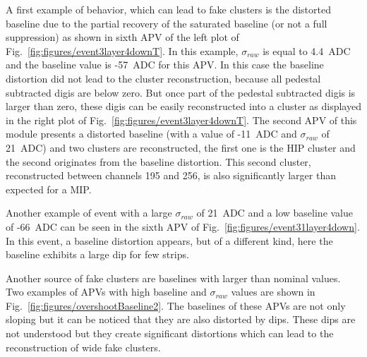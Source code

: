 A first example of behavior, which can lead to fake clusters is the distorted baseline due to the partial recovery of the saturated baseline (or not a full suppression) as shown in sixth APV of the left plot of Fig.~\ref{fig:figures/event3layer4downT}. In this example, $\sigma_{raw}$ is equal to 4.4~ADC and the baseline value is -57~ADC for this APV. In this case the baseline distortion did not lead to the cluster reconstruction, because all pedestal subtracted digis are below zero. But once part of the pedestal subtracted digis is larger than zero, these digis can be easily reconstructed into a cluster as displayed in the right plot of  Fig.~\ref{fig:figures/event3layer4downT}. The second APV of this module presents a distorted baseline (with a value of -11~ADC and $\sigma_{raw}$ of 21~ADC) and two clusters are reconstructed, the first one is the HIP cluster and the second originates from the baseline distortion. This second cluster, reconstructed between channels 195 and 256, is also significantly larger than expected for a MIP. 

Another example of event with a large $\sigma_{raw}$ of 21~ADC and a low baseline value of -66~ADC can be seen in the sixth APV of Fig.~\ref{fig:figures/event31layer4down}. In this event, a baseline distortion appears, but of a different kind, here the baseline exhibits a large dip for few strips. 

Another source of fake clusters are baselines with larger than nominal values. Two examples of APVs with high baseline and $\sigma_{raw}$ values are shown in Fig.~\ref{fig:figures/overshootBaseline2}. The baselines of these APVs are not only sloping but it can be noticed that they are also distorted by dips. These dips are not understood but they create significant distortions which can lead to the reconstruction of wide fake clusters.


